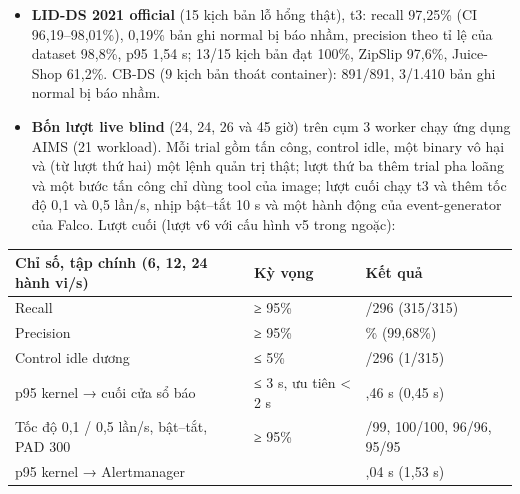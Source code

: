 \begin{itemize}
\tightlist
\item
  \textbf{LID-DS 2021 official} (15 kịch bản lỗ hổng thật), t3: recall 97,25\% (CI 96,19--98,01\%), 0,19\% bản ghi normal bị báo nhầm, precision theo tỉ lệ của dataset 98,8\%, p95 1,54 s; 13/15 kịch bản đạt 100\%, ZipSlip 97,6\%, Juice-Shop 61,2\%. CB-DS (9 kịch bản thoát container): 891/891, 3/1.410 bản ghi normal bị báo nhầm.
\item
  \textbf{Bốn lượt live blind} (24, 24, 26 và 45 giờ) trên cụm 3 worker chạy ứng dụng AIMS (21 workload). Mỗi trial gồm tấn công, control idle, một binary vô hại và (từ lượt thứ hai) một lệnh quản trị thật; lượt thứ ba thêm trial pha loãng và một bước tấn công chỉ dùng tool của image; lượt cuối chạy t3 và thêm tốc độ 0,1 và 0,5 lần/s, nhịp bật--tắt 10 s và một hành động của event-generator của Falco. Lượt cuối (lượt v6 với cấu hình v5 trong ngoặc):
\end{itemize}

\begin{longtable}[]{@{}>{\raggedright\arraybackslash}p{}>{\raggedright\arraybackslash}p{}>{\raggedright\arraybackslash}p{}@{}}
\toprule\noalign{}
Chỉ số, tập chính (6, 12, 24 hành vi/s) & Kỳ vọng & Kết quả \\
\midrule\noalign{}
\endhead
\bottomrule\noalign{}
\endlastfoot
Recall & ≥ 95\% & 296/296 (315/315) \\
Precision & ≥ 95\% & 100\% (99,68\%) \\
Control idle dương & ≤ 5\% & 0/296 (1/315) \\
p95 kernel → cuối cửa sổ báo & ≤ 3 s, ưu tiên \textless{} 2 s & 0,46 s (0,45 s) \\
Tốc độ 0,1 / 0,5 lần/s, bật--tắt, PAD 300 & ≥ 95\% & 99/99, 100/100, 96/96, 95/95 \\
p95 kernel → Alertmanager & & 3,04 s (1,53 s) \\
\end{longtable}

